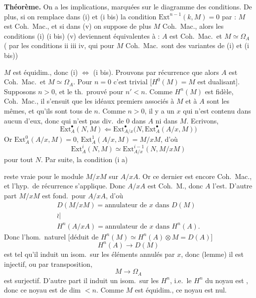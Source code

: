 \documentclass[11pt,a4paper]{article}
\begin{document}
\textbf{Théorème.} On a les implications,
marquées sur le diagramme des conditions. De plus, si on remplace dans
(i) et (i bis) la condition $\mathrm{Ext}^{n-1}(k, M) = 0$ par :
$M$ est Coh.\ Mac., et si dans (v) on suppose de plus $M$ Coh.\ Mac.,
alors  les conditions (i) (i bis) (v) deviennent
équivalentes à : $A$ est Coh.\ Mac.\ et $M \simeq \Omega_A$
( par  les conditions ii iii iv, qui
pour $M$ Coh.\ Mac.\ sont des variantes de (i) et (i bis))

$M$ est équidim., donc (i) $\Leftrightarrow$ (i bis). Prouvons par
récurrence que alors $A$ est Coh.\ Mac.\ et $M \simeq \Omega_A$.
Pour $n = 0$ c'est trivial [$H^0(M) = M$ est dualisant].
Supposons $n > 0$, et le th.\ prouvé pour $n' < n$. \struck{\ill{}}
Comme $H^n(M)$ est fidèle, 
\struck{\ill{}} Coh.\ Mac., il s'ensuit que les idéaux premiers
associés à $M$ et à $A$ sont les mêmes, et qu'ils sont tous de
  $n$. Comme $n > 0$, il y a un $x$ qui
n'est contenu dans aucun d'eux, donc qui n'est pas div.\ de 0 dans $A$ ni
dans $M$.  Ecrivons, 
\[
  \mathrm{Ext}^{\bullet}_A(N, M) \Longleftarrow
  \mathrm{Ext}^{\bullet}_{A/x}\bigl(N, \mathrm{Ext}^{\bullet}_A(A/x, M)\bigr)
\]
Or $\mathrm{Ext}^0_A(A/x, M) = 0$,
$\mathrm{Ext}^1_A(A/x, M) = M/xM$, d'où
\[
  \mathrm{Ext}^i_A(N, M) \simeq \mathrm{Ext}^{i-1}_{A/x}(N, M/xM)
\]
pour tout $N$. Par suite, la condition (i a)

reste vraie pour le module $M/xM$ sur $A/xA$. Or ce dernier est
encore Coh.\ Mac., et l'hyp.\ de récurrence s'applique.
Donc  $A/xA$ est Coh.\ M., donc $A$ l'est. D'autre part
$M/xM$  est fond.\ pour $A/xA$, d'où
\[
  \begin{array}{c}
    D(M/xM) = \text{annulateur de } x \text{ dans } D(M) \\
    \wr| \\
    H^n(A/xA) = \text{annulateur de } x \text{ dans } H^n(A) .
  \end{array}
\]
Donc l'hom.\ naturel [déduit de
$H^n(M) \simeq H^n(A) \otimes M = D(A)$]
\[
  H^n(A) \longrightarrow D(M)
\]
est tel qu'il induit un isom.\ sur les éléments annulés par
$x$, donc (lemme) il est injectif, ou par
transposition,
\[
  M \longrightarrow \Omega_A
\]
est surjectif. D'autre part il induit un isom.\ sur les $H^n$, i.e.\ le
$H^n$ du noyau est , donc ce noyau est de dim $< n$. Comme $M$ est
équidim., ce noyau est nul.
\end{document}
